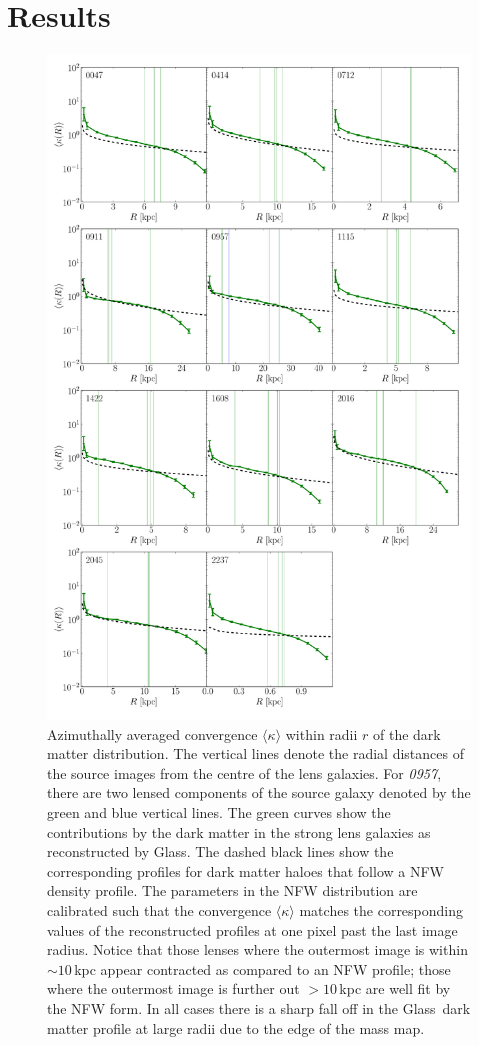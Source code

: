 \documentclass[useAMS,usenatbib]{mn2e}
\def\Glass{{\sc Glass}}
\begin{document}
\section{Results}\label{sec:results}
\begin{figure}
  \centering
  \includegraphics[width=.7\linewidth]{Figures/kappaplot.pdf}
  \caption[width=\linewidth]{Azimuthally averaged convergence $\langle\kappa\rangle$ within radii $r$ of the dark matter distribution. The vertical lines denote the radial distances of the source images from the centre of the lens galaxies. For \textit{0957}, there are two lensed components of the source galaxy denoted by the green and blue vertical lines. The green curves show the contributions by the dark matter in the strong lens galaxies as reconstructed by \Glass. The dashed black lines show the corresponding profiles for dark matter haloes that follow a NFW density profile. The parameters in the NFW distribution are calibrated such that the convergence $\langle\kappa\rangle$ matches the corresponding values of the reconstructed profiles at one pixel past the last image radius. Notice that those lenses where the outermost image is within $\sim 10$\,kpc appear contracted as compared to an NFW profile; those where the outermost image is further out $> 10$\,kpc are well fit by the NFW form. In all cases there is a sharp fall off in the \Glass\ dark matter profile at large radii due to the edge of the mass map.}
  \label{fig:kappaplot}
\end{figure}
\end{document}
